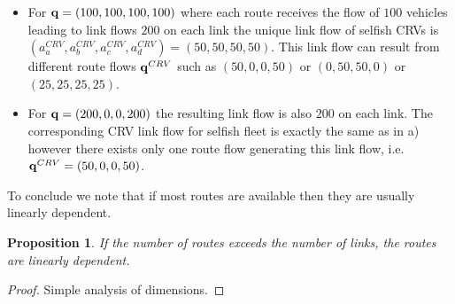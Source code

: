 \documentclass[a4paper,11pt]{article}
\newtheorem{proposition}[theorem]{Proposition}
\begin{document}
\begin{itemize}
\item[a)] For $\bold{q} = (100,100,100,100)$ where each route receives the flow of $100$ vehicles leading to link flows $200$ on each link the unique link flow of selfish CRVs is $(a^{CRV}_a, a^{CRV}_b, a^{CRV}_c, a^{CRV}_d) = (50, 50, 50, 50)$. This link flow can result from different route flows $\bold{q}^{CRV}$ such as $(50, 0, 0, 50)$ or $(0,50,50,0)$ or $(25,25,25,25)$. 
\item[b)] For $\bold{q} = (200, 0, 0, 200)$ the resulting link flow is also $200$ on each link. The corresponding CRV link flow for selfish fleet is exactly the same as in a) however there exists only one route flow generating this link flow, i.e. $\bold{q}^{CRV} = (50,0,0,50)$.  
\end{itemize}

To conclude we note that if most routes are available then they are usually linearly dependent.  
\begin{proposition}
\label{Prop_exceeds}
If the number of routes exceeds the number of links, the routes are linearly dependent. 
\end{proposition}
\begin{proof}
Simple analysis of dimensions.
\end{proof}
\end{document}

